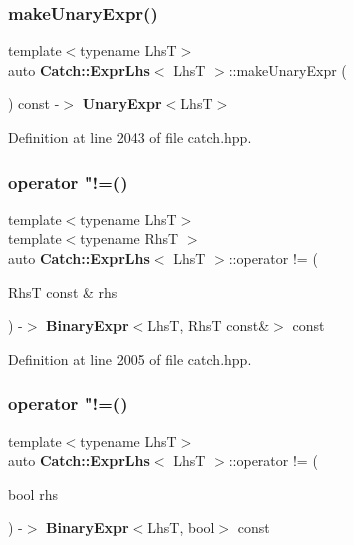\subsubsection{makeUnaryExpr()}
{\footnotesize\ttfamily template$<$typename LhsT$>$ \\
auto \textbf{ Catch\+::\+Expr\+Lhs}$<$ LhsT $>$\+::make\+Unary\+Expr (\begin{DoxyParamCaption}{ }\end{DoxyParamCaption}) const -\/$>$ \textbf{ Unary\+Expr}$<$LhsT$>$ \hspace{0.3cm}{\ttfamily [inline]}}



Definition at line 2043 of file catch.\+hpp.

\mbox{\label{class_catch_1_1_expr_lhs_af4c6b85fb0d089fcf55d961e1efed5ea}} 
\subsubsection{operator "!=()\hspace{0.1cm}{\footnotesize\ttfamily [1/2]}}
{\footnotesize\ttfamily template$<$typename LhsT$>$ \\
template$<$typename RhsT $>$ \\
auto \textbf{ Catch\+::\+Expr\+Lhs}$<$ LhsT $>$\+::operator != (\begin{DoxyParamCaption}\item[{RhsT const \&}]{rhs }\end{DoxyParamCaption}) -\/$>$ \textbf{ Binary\+Expr}$<$LhsT, RhsT const\&$>$ const \hspace{0.3cm}{\ttfamily [inline]}}



Definition at line 2005 of file catch.\+hpp.

\mbox{\label{class_catch_1_1_expr_lhs_a75c4081701b1e57c32ffbdf124fe4297}} 
\subsubsection{operator "!=()\hspace{0.1cm}{\footnotesize\ttfamily [2/2]}}
{\footnotesize\ttfamily template$<$typename LhsT$>$ \\
auto \textbf{ Catch\+::\+Expr\+Lhs}$<$ LhsT $>$\+::operator != (\begin{DoxyParamCaption}\item[{bool}]{rhs }\end{DoxyParamCaption}) -\/$>$ \textbf{ Binary\+Expr}$<$LhsT, bool$>$ const \hspace{0.3cm}{\ttfamily [inline]}}



